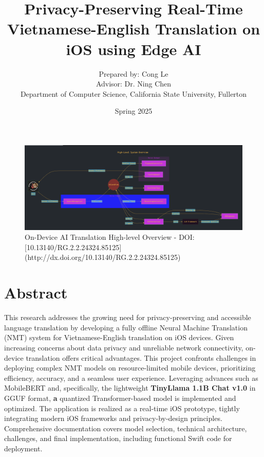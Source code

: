 \documentclass[12pt]{article}
\title{\textbf{Privacy-Preserving Real-Time Vietnamese-English Translation on iOS using Edge AI}}
\author{Prepared by: Cong Le \\
Advisor: Dr. Ning Chen \\
Department of Computer Science, California State University, Fullerton}
\date{Spring 2025}
\begin{document}
\maketitle

\begin{center}
\begin{figure}
    \centering
    \includegraphics[width=1\linewidth]{Real_time_AI_agent_chat_app_high_level_sytem_overview.png}
    \caption{On-Device AI Translation High-level Overview - DOI:[10.13140/RG.2.2.24324.85125](http://dx.doi.org/10.13140/RG.2.2.24324.85125)}
    \label{fig:On_Device_AI_Translation_High_level_Overview}
\end{figure}

\end{center}

\section*{Abstract}
This research addresses the growing need for privacy-preserving and accessible language translation by developing a fully offline Neural Machine Translation (NMT) system for Vietnamese-English translation on iOS devices. Given increasing concerns about data privacy and unreliable network connectivity, on-device translation offers critical advantages. This project confronts challenges in deploying complex NMT models on resource-limited mobile devices, prioritizing efficiency, accuracy, and a seamless user experience. Leveraging advances such as MobileBERT and, specifically, the lightweight \textbf{TinyLlama 1.1B Chat v1.0} in GGUF format, \textbf{a} quantized Transformer-based model is implemented and optimized. The application is realized as a real-time iOS prototype, tightly integrating modern iOS frameworks and privacy-by-design principles. Comprehensive documentation covers model selection, technical architecture, challenges, and final implementation, including functional Swift code for deployment.
\end{document}
